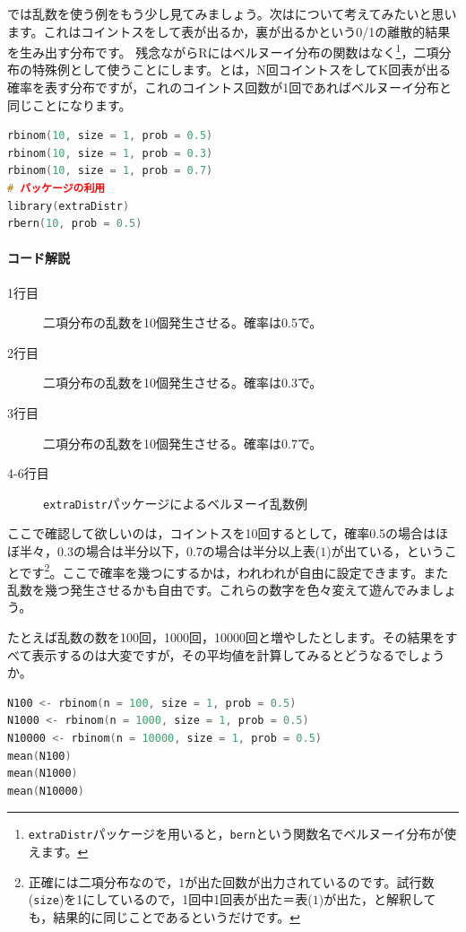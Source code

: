 \documentclass{ltjsbook}
\begin{document}
では乱数を使う例をもう少し見てみましょう。次はについて考えてみたいと思います。これはコイントスをして表が出るか，裏が出るかという0/1の離散的結果を生み出す分布です。
残念ながらRにはベルヌーイ分布の関数はなく\footnote{\texttt{extraDistr}パッケージを用いると，\texttt{bern}という関数名でベルヌーイ分布が使えます。}，二項分布の特殊例として使うことにします。とは，N回コイントスをしてK回表が出る確率を表す分布ですが，これのコイントス回数が1回であればベルヌーイ分布と同じことになります。
\begin{lstlisting}[language=c++,label={code:03_02},caption={乱数のコードの例2}]
rbinom(10, size = 1, prob = 0.5)
rbinom(10, size = 1, prob = 0.3)
rbinom(10, size = 1, prob = 0.7)
# パッケージの利用
library(extraDistr)
rbern(10, prob = 0.5)
\end{lstlisting}
\paragraph{コード解説}
\begin{description}
	\item[1行目] 二項分布の乱数を10個発生させる。確率は0.5で。
	\item[2行目] 二項分布の乱数を10個発生させる。確率は0.3で。
	\item[3行目] 二項分布の乱数を10個発生させる。確率は0.7で。
	\item[4-6行目] \texttt{extraDistr}パッケージによるベルヌーイ乱数例
\end{description}

ここで確認して欲しいのは，コイントスを10回するとして，確率0.5の場合はほぼ半々，0.3の場合は半分以下，0.7の場合は半分以上表($1$)が出ている，ということです\footnote{正確には二項分布なので，1が出た回数が出力されているのです。試行数(\texttt{size})を1にしているので，1回中1回表が出た＝表($1$)が出た，と解釈しても，結果的に同じことであるというだけです。}。ここで確率を幾つにするかは，われわれが自由に設定できます。また乱数を幾つ発生させるかも自由です。これらの数字を色々変えて遊んでみましょう。

たとえば乱数の数を100回，1000回，10000回と増やしたとします。その結果をすべて表示するのは大変ですが，その平均値を計算してみるとどうなるでしょうか。
\begin{lstlisting}[language=c++,label={code:03_03},caption={乱数のコードの例3}]
N100 <- rbinom(n = 100, size = 1, prob = 0.5)
N1000 <- rbinom(n = 1000, size = 1, prob = 0.5)
N10000 <- rbinom(n = 10000, size = 1, prob = 0.5)
mean(N100)
mean(N1000)
mean(N10000)
\end{lstlisting}
\end{document}
